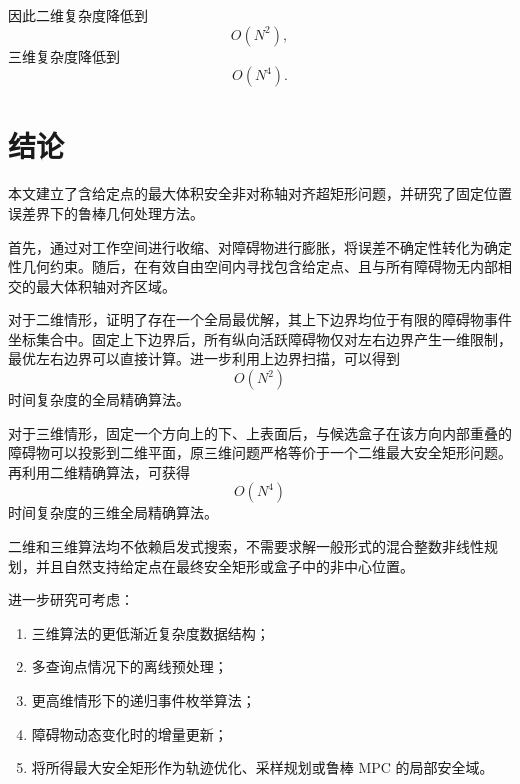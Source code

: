 \documentclass[UTF8,12pt,a4paper]{ctexart}
\begin{document}
因此二维复杂度降低到
\[
O(N^2),
\]
三维复杂度降低到
\[
O(N^4).
\]

\section{结论}

本文建立了含给定点的最大体积安全非对称轴对齐超矩形问题，并研究了固定位置误差界下的鲁棒几何处理方法。

首先，通过对工作空间进行收缩、对障碍物进行膨胀，将误差不确定性转化为确定性几何约束。随后，在有效自由空间内寻找包含给定点、且与所有障碍物无内部相交的最大体积轴对齐区域。

对于二维情形，证明了存在一个全局最优解，其上下边界均位于有限的障碍物事件坐标集合中。固定上下边界后，所有纵向活跃障碍物仅对左右边界产生一维限制，最优左右边界可以直接计算。进一步利用上边界扫描，可以得到
\[
\boxed{O(N^2)}
\]
时间复杂度的全局精确算法。

对于三维情形，固定一个方向上的下、上表面后，与候选盒子在该方向内部重叠的障碍物可以投影到二维平面，原三维问题严格等价于一个二维最大安全矩形问题。再利用二维精确算法，可获得
\[
\boxed{O(N^4)}
\]
时间复杂度的三维全局精确算法。

二维和三维算法均不依赖启发式搜索，不需要求解一般形式的混合整数非线性规划，并且自然支持给定点在最终安全矩形或盒子中的非中心位置。

进一步研究可考虑：
\begin{enumerate}[label=(\arabic*)]
    \item 三维算法的更低渐近复杂度数据结构；
    \item 多查询点情况下的离线预处理；
    \item 更高维情形下的递归事件枚举算法；
    \item 障碍物动态变化时的增量更新；
    \item 将所得最大安全矩形作为轨迹优化、采样规划或鲁棒 MPC 的局部安全域。
\end{enumerate}
\end{document}
